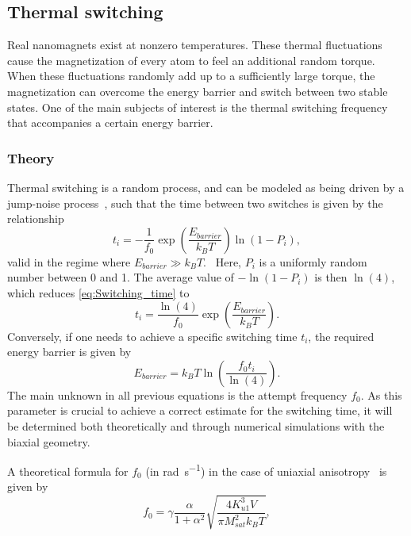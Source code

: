 \documentclass[11pt,a4paper,english]{article}
\begin{document}
\subsection{Thermal switching}
Real nanomagnets exist at nonzero temperatures. These thermal fluctuations cause the magnetization of every atom to feel an additional random torque. When these fluctuations randomly add up to a sufficiently large torque, the magnetization can overcome the energy barrier and switch between two stable states. One of the main subjects of interest is the thermal switching frequency that accompanies a certain energy barrier.

\subsubsection{Theory}
Thermal switching is a random process, and can be modeled as being driven by a jump-noise process~\cite{MagDynamics_JumpNoise}, such that the time between two switches is given by the relationship
\begin{equation}
    t_i = -\frac{1}{f_0} \exp(\frac{E_{barrier}}{k_B T}) \ln(1-P_i) \mathrm{,}
    \label{eq:Switching_time}
\end{equation}
valid in the regime where $E_{barrier} \gg k_B T$.~\cite{RandomSwitch_MonteCarlo} Here, $P_i$ is a uniformly random number between 0 and 1. The average value of $-\ln(1-P_i)$ is then $\ln(4)$, which reduces \cref{eq:Switching_time} to
\begin{equation}
    t_i = \frac{\ln(4)}{f_0} \exp(\frac{E_{barrier}}{k_B T})  \mathrm{.}
    \label{eq:Switching_time_average}
\end{equation}
Conversely, if one needs to achieve a specific switching time $t_i$, the required energy barrier is given by
\begin{equation}
    E_{barrier} = k_B T \ln(\frac{f_0 t_i}{\ln(4)}) \mathrm{.}
\end{equation}
The main unknown in all previous equations is the attempt frequency $f_0$. As this parameter is crucial to achieve a correct estimate for the switching time, it will be determined both theoretically and through numerical simulations with the biaxial geometry. \par
A theoretical formula for $f_0$ (in \si{\radian\per\second}) in the case of uniaxial anisotropy~\cite{MuMax3, LEL-17b, f0_mumax3_reference} is given by
\begin{equation}
    f_0 = \gamma \frac{\alpha}{1+\alpha^2} \sqrt{\frac{4 K_{u1}^3 V}{\pi M_{sat}^2 k_B T}} \mathrm{,}
    \label{eq:f0_theoretical_uniaxial}
\end{equation}
\end{document}
